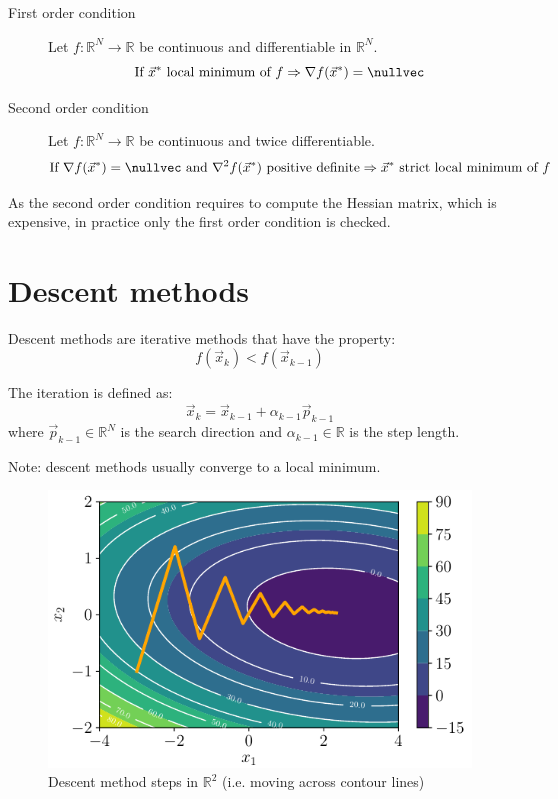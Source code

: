\begin{description}
    \item[First order condition] 
        Let $f: \mathbb{R}^N \rightarrow \mathbb{R}$ be continuous and differentiable in $\mathbb{R}^N$.
        \[ \text{If } \vec{x}^* \text{ local minimum of } f \Rightarrow \nabla f(\vec{x}^*) = \nullvec \]

    \item[Second order condition] 
        Let $f: \mathbb{R}^N \rightarrow \mathbb{R}$ be continuous and twice differentiable.
        \[ 
            \text{If } \nabla f(\vec{x}^*) = \nullvec \text{ and } \nabla^2 f(\vec{x}^*) \text{ positive definite} \Rightarrow 
            \vec{x}^* \text{ strict local minimum of } f 
        \]
\end{description}

As the second order condition requires to compute the Hessian matrix, which is expensive, in practice only the first order condition is checked.



\section{Descent methods}

Descent methods are iterative methods that have the property:
\[ f(\vec{x}_k) < f(\vec{x}_{k-1}) \]

The iteration is defined as:
\[ \vec{x}_k = \vec{x}_{k-1} + \alpha_{k-1}\vec{p}_{k-1} \]
where $\vec{p}_{k-1} \in \mathbb{R}^N$ is the search direction and 
$\alpha_{k-1} \in \mathbb{R}$ is the step length.

Note: descent methods usually converge to a local minimum.

\begin{figure}
    \centering
    \includegraphics[width=0.5\linewidth]{img/_gradient_contour.pdf}
    \caption{Descent method steps in $\mathbb{R}^2$ (i.e. moving across contour lines)}
\end{figure}


